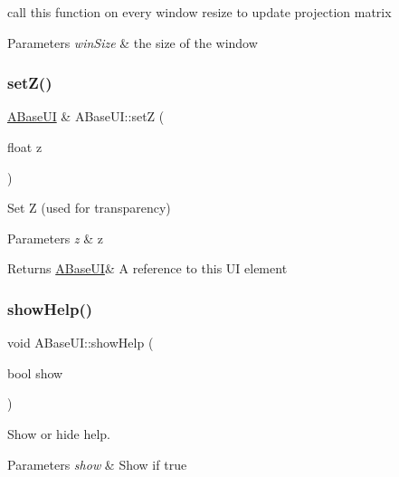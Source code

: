 call this function on every window resize to update projection matrix 


\begin{DoxyParams}{Parameters}
{\em win\+Size} & the size of the window \\
\hline
\end{DoxyParams}
\mbox{\label{class_a_base_u_i_a9b7e138cf37199808f55a4596efe4ac9}} 
\subsubsection{\texorpdfstring{set\+Z()}{setZ()}}
{\footnotesize\ttfamily \hyperlink{class_a_base_u_i}{A\+Base\+UI} \& A\+Base\+U\+I\+::setZ (\begin{DoxyParamCaption}\item[{float}]{z }\end{DoxyParamCaption})\hspace{0.3cm}{\ttfamily [virtual]}}



Set Z (used for transparency) 


\begin{DoxyParams}{Parameters}
{\em z} & z \\
\hline
\end{DoxyParams}
\begin{DoxyReturn}{Returns}
\hyperlink{class_a_base_u_i}{A\+Base\+UI}\& A reference to this UI element 
\end{DoxyReturn}
\mbox{\label{class_a_base_u_i_a6cee1445e2dcf10626d1d431b4f9d227}} 
\subsubsection{\texorpdfstring{show\+Help()}{showHelp()}}
{\footnotesize\ttfamily void A\+Base\+U\+I\+::show\+Help (\begin{DoxyParamCaption}\item[{bool}]{show }\end{DoxyParamCaption})\hspace{0.3cm}{\ttfamily [static]}}



Show or hide help. 


\begin{DoxyParams}{Parameters}
{\em show} & Show if true \\
\hline
\end{DoxyParams}
\mbox{\label{class_a_base_u_i_a13e855c7ec774ca5dda69dc863c28e1b}} 
